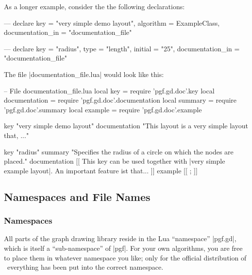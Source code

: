 
As a longer example, consider the the following declarations:

\begin{codeexample}
---
declare {
  key               = "very simple demo layout",
  algorithm         = ExampleClass,
  documentation_in  = "documentation_file"
}

--- 
declare {
  key               = "radius",
  type              = "length",
  initial           = "25",
  documentation_in  = "documentation_file"
}
\end{codeexample}

The file |documentation_file.lua| would look like this:

\begin{codeexample}
-- File documentation_file.lua
local key           = require 'pgf.gd.doc'.key
local documentation = require 'pgf.gd.doc'.documentation
local summary       = require 'pgf.gd.doc'.summary
local example       = require 'pgf.gd.doc'.example

key           "very simple demo layout"
documentation "This layout is a very simple layout that, ..."

key           "radius"
summary       "Specifies the radius of a circle on which the nodes are placed."
documentation
[[
This key can be used together with |very simple example layout|. An
important feature ist that...
]]
example
[[
\tikz {};
]]
\end{codeexample}




\subsection{Namespaces and File Names}

\label{section-gd-namespaces}

\subsubsection{Namespaces}

All parts of the graph drawing library reside in the Lua ``namespace''
|pgf.gd|, which is itself a ``sub-namespace'' of |pgf|. For your own
algorithms, you are free to place them in whatever namespace you like;
only for the official distribution of \pgfname\ everything has been
put into the correct namespace.

